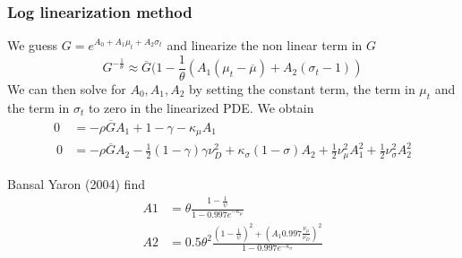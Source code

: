 \documentclass[english]{article}
\begin{document}
\subsubsection{Log linearization method}
We guess $G = e^{A_0+ A_1\mu_t + A_2 \sigma_t}$ and linearize the non linear term in $G$ 
$$G^{-\frac{1}{\theta}} \approx \overline{G}(1-\frac{1}{\theta}(A_1(\mu_t -\overline{\mu}) + A_2 (\sigma_t-1))$$
We can then solve for $A_0, A_1, A_2$ by setting the constant term, the term in $\mu_t$ and the term in $\sigma_t$ to zero in the linearized PDE. We obtain
\begin{align*}
	0&=-\rho  \overline{G}A_1 + 1-\gamma -\kappa_\mu A_1\\\
	0&=-\rho  \overline{G}A_2 -\frac{1}{2}(1-\gamma)\gamma \nu_D^2 + \kappa_\sigma (1-\sigma)A_2 + \frac{1}{2}\nu_\mu^2A_1^2 +\frac{1}{2}\nu_\sigma^2A_2^2
\end{align*}

Bansal Yaron (2004) find
\begin{align*}
	A1 &= \theta \frac{1-\frac{1}{\psi}}{1-0.997 e^{-\kappa_\mu}}\\
	A2 &= 0.5\theta^2\frac{(1 - \frac{1}{\psi})^2 + (A_1  0.997 \frac{\nu_\mu}{\nu_D})^2}{1-0.997e^{-\kappa_\sigma}}
\end{align*}
\end{document}
